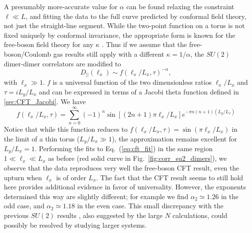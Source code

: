 \documentclass[11pt]{iopart}
\begin{document}
A presumably more-accurate value for $\alpha$ can be found relaxing the constraint $\ell \ll L$, and fitting the data to the full curve predicted by conformal field theory, not just the straight-line segment. While the two-point function on a torus is not fixed uniquely by conformal invariance, the appropriate form is known for the free-boson field theory for any $\kappa$ \cite{BigYellowBook}. Thus if we assume that the free-boson/Coulomb gas results still apply with a different $\kappa=1/\alpha$,  the $SU(2)$ dimer-dimer correlators are modified to 
\begin{equation}\label{eq:cft_fit}
 D_{||}(\ell_x)\sim f(\ell_x/L_x,\tau)^{-\alpha},
\end{equation}
with $\ell_x \gg 1$. $f$ is a universal function of the two dimensionless ratios $\ell_x/L_x$ and $\tau =i L_y/L_x$ and can be expressed in terms of a Jacobi theta function defined in \ref{sec:CFT_Jacobi}. We have 
\begin{equation}
 f(\ell_x/L_x,\tau)=\sum_{n=0}^{\infty}(-1)^n \sin \left[(2n+1)\pi \ell_x/L_x\right]e^{-\pi n(n+1)(L_y/L_x)}
\end{equation}
Notice that while this function reduces to $f(\ell_x/L_x,\tau)=\sin(\pi \ell_x/L_x)$ in the limit of a thin torus ($L_y/L_x \gg 1$), the approximation remains excellent for $L_y/L_x=1$. Performing the fits to Eq.~(\ref{eq:cft_fit}) in the same region $1\ll \ell_x \ll L_x$ as before (red solid curve in Fig.~\ref{fig:corr_su2_dimers}), we observe that the data reproduces very well the free-boson CFT result, even the upturn when $\ell_x$ is of order $L_x$. The fact that the CFT result seems to still hold here provides additional evidence in favor of universality. However, the exponents determined this way are slightly different; for example we find $\alpha_2\simeq 1.26$ in the odd case, and $\alpha_2\simeq 1.18$ in the even case. This small discrepancy with the previous $SU(2)$ results \cite{RVB1,RVB2}, also suggested by the large $N$ calculations\cite{Damle}, could possibly be resolved by studying larger systems.  
\end{document}
